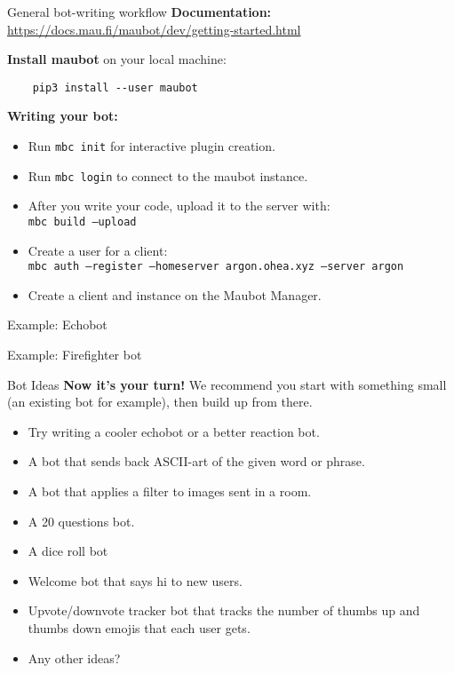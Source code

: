 \documentclass{acm}
\begin{document}
\begin{frame}[fragile]{General bot-writing workflow}
    \textbf{Documentation:}
    \url{https://docs.mau.fi/maubot/dev/getting-started.html}

    \bigskip

    \textbf{Install maubot} on your local machine:
    \begin{verbatim}
    pip3 install --user maubot
    \end{verbatim}

    \textbf{Writing your bot:}
    \begin{itemize}
        \item Run \texttt{mbc init} for interactive plugin creation.
        \item Run \texttt{mbc login} to connect to the maubot instance.
        \item After you write your code, upload it to the server with: \\
            \texttt{mbc build --upload}
        \item Create a user for a client: \\
            \texttt{mbc auth --register --homeserver argon.ohea.xyz --server argon}
        \item Create a client and instance on the Maubot Manager.
    \end{itemize}
\end{frame}

\begin{frame}[standout]
    \Huge
    Example: Echobot
\end{frame}

\begin{frame}[standout]
    \Huge
    Example: Firefighter bot
\end{frame}

\begin{frame}{Bot Ideas}
    \textbf{Now it's your turn!} We recommend you start with something small (an
    existing bot for example), then build up from there.

    \begin{itemize}
        \item Try writing a cooler echobot or a better reaction bot.
        \item A bot that sends back ASCII-art of the given word or phrase.
        \item A bot that applies a filter to images sent in a room.
        \item A 20 questions bot.
        \item A dice roll bot
        \item Welcome bot that says hi to new users.
        \item Upvote/downvote tracker bot that tracks the number of thumbs up
            and thumbs down emojis that each user gets.
        \item Any other ideas?
    \end{itemize}
\end{frame}
\end{document}

